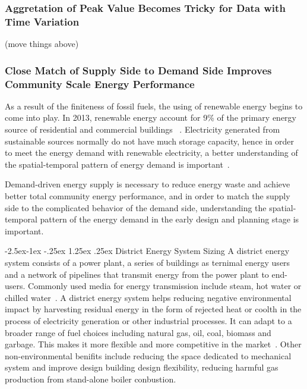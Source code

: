 \documentclass[hidelinks,12pt]{article}
\makeatletter
\newcommand{\grey}[1]{\textcolor{black!30}{#1}}
\renewcommand\paragraph{\@startsection{paragraph}{4}{\z@}%
            {-2.5ex\@plus -1ex \@minus -.25ex}%
            {1.25ex \@plus .25ex}%
            {\normalfont\normalsize\bfseries}}
\makeatother
\begin{document}
\subsubsection{Aggretation of Peak Value Becomes Tricky for Data with Time Variation}
\grey{(move things above)}

\begin{comment}
\subsubsection{Temporal variation of the Supply Side}
The commonly used renewable energy source includes: solar, wind,
geothermal, hydropower and biomass. Among these sources, solar energy
have strong temporal fluctuation as a result of the temporal variation
of solar radiation between different hours of a year and the time of
year~\cite{EIARenewable2015}. There is also a cost difference involved
in the electricity supply.
\end{comment}

\subsubsection{Close Match of Supply Side to Demand Side Improves
  Community Scale Energy Performance}
As a result of the finiteness of fossil fuels, the using of renewable
energy begins to come into play. In 2013, renewable energy account for
9\% of the primary energy source of residential and commercial
buildings ~\cite{EIAPrimary2013}. Electricity generated from
sustainable sources normally do not have much storage capacity, hence
in order to meet the energy demand with renewable electricity, a
better understanding of the spatial-temporal pattern of energy demand
is important~\cite{Mikkola2014256}.

Demand-driven energy supply is necessary to reduce energy waste and
achieve better total community energy performance, and in order to
match the supply side to the complicated behavior of the demand side,
understanding the spatial-temporal pattern of the energy demand 
in the early design and planning stage is important. 

\paragraph{District Energy System Sizing}
A district energy system consists of a power plant, a series of
buildings as ternimal energy users and a network of pipelines that
transmit energy from the power plant to end-users. Commonly used media
for energy transmission include steam, hot water or chilled
water~\cite{baird2014}. A district energy system helps reducing
negative environmental impact by harvesting residual energy in the
form of rejected heat or coolth in the process of electricity
generation or other industrial processes. It can adapt to a broader
range of fuel choices including natural gas, oil, coal, biomass and
garbage. This makes it more flexible and more competitive in the
market~\cite{IDEA2005}. Other non-environmental benifits include
reducing the space dedicated to mechanical system and improve design
building design flexibility, reducing harmful gas production from
stand-alone boiler conbustion.
\end{document}
